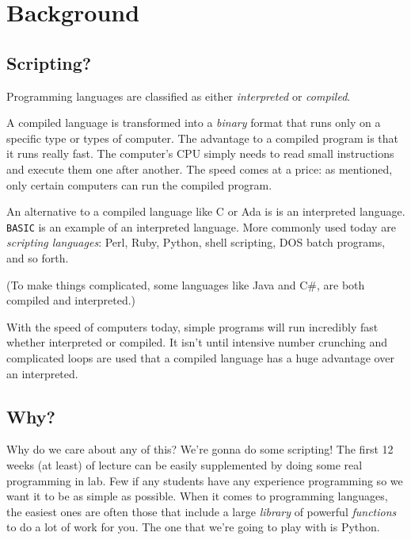 \documentclass[11pt, letterpaper]{article}
\begin{document}

\section*{Background}

\subsection*{Scripting?}

Programming languages are classified as either {\em interpreted} or {\em compiled}.

A compiled language is transformed into a {\em binary} format that runs only on a specific type or types of computer. The advantage to a compiled program is that it runs really fast. The computer's CPU simply needs to read small instructions and execute them one after another. The speed comes at a price: as mentioned, only certain computers can run the compiled program.

An alternative to a compiled language like C or Ada is is an interpreted language. {\tt BASIC} is an example of an interpreted language. More commonly used today are {\em scripting languages}: Perl, Ruby, Python, shell scripting, DOS batch programs, and so forth.

(To make things complicated, some languages like Java and C\#, are both compiled and interpreted.)

With the speed of computers today, simple programs will run incredibly fast whether interpreted or compiled. It isn't until intensive number crunching and complicated loops are used that a compiled language has a huge advantage over an interpreted.

\subsection*{Why?}

Why do we care about any of this? We're gonna do some scripting! The first 12 weeks (at least) of lecture can be easily supplemented by doing some real programming in lab. Few if any students have any experience programming so we want it to be as simple as possible. When it comes to programming languages, the easiest ones are often those that include a large {\em library} of powerful {\em functions} to do a lot of work for you. The one that we're going to play with is Python.
\end{document}
